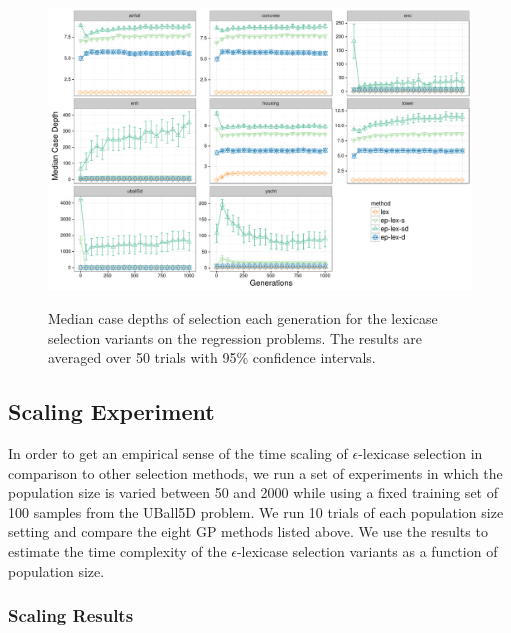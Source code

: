 \documentclass[twoside]{article}
\begin{document}
\begin{figure}[htb]
\centering
  \includegraphics[width=\textwidth]{figs/median_case_depth.pdf}\\
 \caption{Median case depths of selection each generation for the lexicase selection variants on the regression problems. The results are averaged over 50 trials with 95\% confidence intervals. } 
\label{fig:case_depth}
\end{figure}

\label{tbl:tables===}





\subsection{Scaling Experiment}
In order to get an empirical sense of the time scaling of $\epsilon$-lexicase selection in comparison to other selection methods, we run a set of experiments in which the population size is varied between 50 and 2000 while using a fixed training set of 100 samples from the UBall5D problem. We run 10 trials of each population size setting and compare the eight GP methods listed above. We use the results to estimate the time complexity of the $\epsilon$-lexicase selection variants as a function of population size. 

\subsubsection{Scaling Results}
\end{document}
